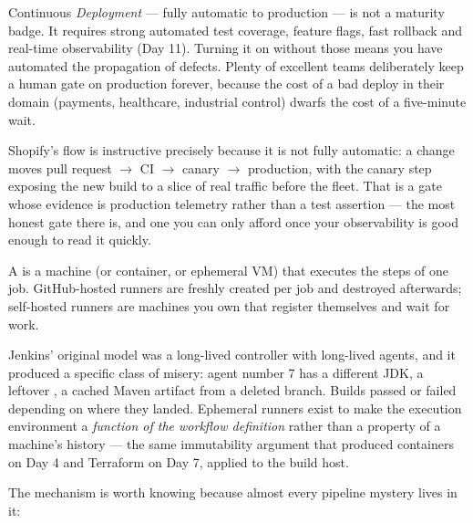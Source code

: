  Continuous \emph{Deployment} --- fully automatic to production --- is not a maturity badge. It requires strong automated test coverage, feature flags, fast rollback and real-time observability (Day 11). Turning it on without those means you have automated the propagation of defects. Plenty of excellent teams deliberately keep a human gate on production forever, because the cost of a bad deploy in their domain (payments, healthcare, industrial control) dwarfs the cost of a five-minute wait.

 Shopify's flow is instructive precisely because it is not fully automatic: a change moves pull request $\rightarrow$ CI $\rightarrow$ canary $\rightarrow$ production, with the canary step exposing the new build to a slice of real traffic before the fleet. That is a gate whose evidence is production telemetry rather than a test assertion --- the most honest gate there is, and one you can only afford once your observability is good enough to read it quickly.


 A  is a machine (or container, or ephemeral VM) that executes the steps of one job. GitHub-hosted runners are freshly created per job and destroyed afterwards; self-hosted runners are machines you own that register themselves and wait for work.

 Jenkins' original model was a long-lived controller with long-lived agents, and it produced a specific class of misery: agent number 7 has a different JDK, a leftover , a cached Maven artifact from a deleted branch. Builds passed or failed depending on where they landed. Ephemeral runners exist to make the execution environment a \emph{function of the workflow definition} rather than a property of a machine's history --- the same immutability argument that produced containers on Day 4 and Terraform on Day 7, applied to the build host.

 The mechanism is worth knowing because almost every pipeline mystery lives in it:

